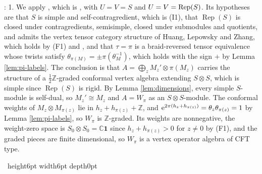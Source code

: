 \documentclass[leqno]{article}
\newcommand{\Cbb}{\ensuremath{\mathbb{C}}}
\let\cal\relax
\newcommand{\cal}{\mathcal}
\newcommand{\Z}{\ensuremath{\mathbb{Z}}}
\newcommand{\qed}{\hfill \vrule height6pt  width6pt depth0pt}
\newcommand{\ot}{\otimes}
\let\i\relax
\newcommand{\i}{\mathrm{i}}
\newcommand{\e}{\mathrm{e}}
\DeclareMathOperator{\Rep}{Rep}
\newenvironment{proof}[1][]{\noindent {\it Proof #1} : }{\hbox{~}\qed
\smallskip
}
\numberwithin{equation}{section}
\begin{document}
\begin{proof}
1. We apply \cite[Theorem 5.10(1) p.~51]{CKM22}, which is \cite[Main Theorem 3(1) pp.~4--5]{CKM22}, with $U = V = S$ and $\cal U = \cal V = \Rep(S)$. Its hypotheses are that $S$ is simple and self-contragredient, which is (I1), that $\Rep(S)$ is closed under contragredients, semisimple, closed under submodules and quotients, and admits the vertex tensor category structure of Huang, Lepowsky and Zhang, which holds by (F1) and \cite{Hua08}, and that $\tau = \pi$ is a braid-reversed tensor equivalence whose twists satisfy $\theta_{\pi(M)} = \pm\pi(\theta_M^{-1})$, which holds with the sign $+$ by Lemma \ref{lem:pi-labels}. The conclusion is that $A = \bigoplus_z M_z' \ot \pi(M_z)$ carries the structure of a $\frac12\Z$-graded conformal vertex algebra extending $S \ot S$, which is simple since $\Rep(S)$ is rigid. By Lemma \ref{lem:dimensions}, every simple $S$-module is self-dual, so $M_z' \cong M_z$ and $A = W_\pi$ as an $S \ot S$-module. The conformal weights of $M_z \ot M_{\pi(z)}$ lie in $h_z+h_{\pi(z)}+\Z$, and $\e^{2\pi\i(h_z+h_{\pi(z)})} = \theta_z\theta_{\pi(z)} = 1$ by Lemma \ref{lem:pi-labels}, so $W_\pi$ is $\Z$-graded. Its weights are nonnegative, the weight-zero space is $S_0 \ot S_0 = \Cbb\mathbf 1$ since $h_z+h_{\pi(z)} > 0$ for $z \neq 0$ by (F1), and the graded pieces are finite dimensional, so $W_\pi$ is a vertex operator algebra of CFT type.


\end{proof}
\end{document}
